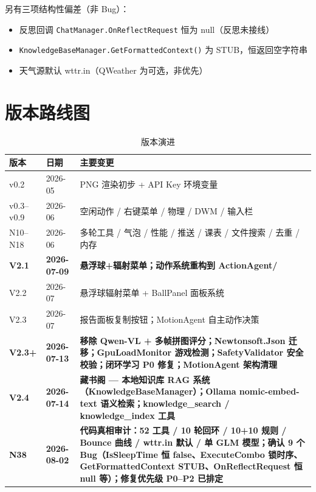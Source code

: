 \documentclass[12pt,a4paper]{ctexart}
\begin{document}
另有三项结构性偏差（非 Bug）：

\begin{itemize}
    \item 反思回调 \texttt{ChatManager.OnReflectRequest} 恒为 null（反思未接线）
    \item \texttt{KnowledgeBaseManager.GetFormattedContext()} 为 STUB，恒返回空字符串
    \item 天气源默认 wttr.in（QWeather 为可选，非优先）
\end{itemize}

\section{版本路线图}

\begin{table}[H]
\centering
\caption{版本演进}
\label{tab:versions}
\begin{tabular}{llp{7cm}}
\toprule
\textbf{版本} & \textbf{日期} & \textbf{主要变更} \\
\midrule
v0.2 & 2026-05 & PNG 渲染初步 + API Key 环境变量 \\
v0.3--v0.9 & 2026-06 & 空闲动作 / 右键菜单 / 物理 / DWM / 输入栏 \\
N10--N18 & 2026-06 & 多轮工具 / 气泡 / 性能 / 推送 / 课表 / 文件搜索 / 去重 / 内存 \\
\textbf{V2.1} & \textbf{2026-07-09} & \textbf{悬浮球+辐射菜单；动作系统重构到 ActionAgent/} \\
V2.2 & 2026-07 & 悬浮球辐射菜单 + BallPanel 面板系统 \\
V2.3 & 2026-07 & 报告面板复制按钮；MotionAgent 自主动作决策 \\
\textbf{V2.3+} & \textbf{2026-07-13} & \textbf{移除 Qwen-VL + 多帧拼图评分；Newtonsoft.Json 迁移；GpuLoadMonitor 游戏检测；SafetyValidator 安全校验；闭环学习 P0 修复；MotionAgent 架构清理} \\
\textbf{V2.4} & \textbf{2026-07-14} & \textbf{藏书阁 — 本地知识库 RAG 系统（KnowledgeBaseManager）；Ollama nomic-embed-text 语义检索；knowledge\_search / knowledge\_index 工具} \\
\textbf{N38} & \textbf{2026-08-02} & \textbf{代码真相审计：52 工具 / 10 轮回环 / 10+10 规则 / Bounce 曲线 / wttr.in 默认 / 单 GLM 模型；确认 9 个 Bug（IsSleepTime 恒 false、ExecuteCombo 锁时序、GetFormattedContext STUB、OnReflectRequest 恒 null 等）；修复优先级 P0--P2 已排定} \\
\bottomrule
\end{tabular}
\end{table}
\end{document}
